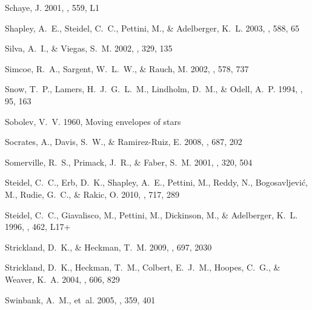 \documentclass[12pt,preprint]{aastex}
\begin{document}
\begin{thebibliography}{74}
{Schaye}, J. 2001, \apjl, 559, L1

{Shapley}, A.~E., {Steidel}, C.~C., {Pettini}, M., \& {Adelberger}, K.~L. 2003,
  \apj, 588, 65

{Silva}, A.~I., \& {Viegas}, S.~M. 2002, \mnras, 329, 135

{Simcoe}, R.~A., {Sargent}, W.~L.~W., \& {Rauch}, M. 2002, \apj, 578, 737

{Snow}, T.~P., {Lamers}, H.~J.~G.~L.~M., {Lindholm}, D.~M., \& {Odell}, A.~P.
  1994, \apjs, 95, 163

{Sobolev}, V.~V. 1960, {Moving envelopes of stars}

{Socrates}, A., {Davis}, S.~W., \& {Ramirez-Ruiz}, E. 2008, \apj, 687, 202

{Somerville}, R.~S., {Primack}, J.~R., \& {Faber}, S.~M. 2001, \mnras, 320, 504

{Steidel}, C.~C., {Erb}, D.~K., {Shapley}, A.~E., {Pettini}, M., {Reddy}, N.,
  {Bogosavljevi{\'c}}, M., {Rudie}, G.~C., \& {Rakic}, O. 2010, \apj, 717, 289

{Steidel}, C.~C., {Giavalisco}, M., {Pettini}, M., {Dickinson}, M., \&
  {Adelberger}, K.~L. 1996, \apjl, 462, L17+

{Strickland}, D.~K., \& {Heckman}, T.~M. 2009, \apj, 697, 2030

{Strickland}, D.~K., {Heckman}, T.~M., {Colbert}, E.~J.~M., {Hoopes}, C.~G., \&
  {Weaver}, K.~A. 2004, \apj, 606, 829

{Swinbank}, A.~M., {et~al.} 2005, \mnras, 359, 401


\end{thebibliography}
\end{document}
